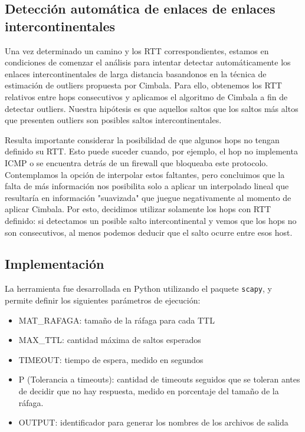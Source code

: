\subsection{Detección automática de enlaces de enlaces intercontinentales}

Una vez determinado un camino y los RTT correspondientes, estamos en condiciones de comenzar el análisis para intentar detectar automáticamente los enlaces intercontinentales de larga distancia basandonos en la técnica de estimación de outliers propuesta por Cimbala. Para ello, obtenemos los RTT relativos entre hops consecutivos y aplicamos el algoritmo de Cimbala a fin de detectar outliers. Nuestra hipótesis es que aquellos saltos que los saltos más altos que presenten outliers son posibles saltos intercontinentales. 

Resulta importante considerar la posibilidad de que algunos hops no tengan definido su RTT. Esto puede suceder cuando, por ejemplo, el hop no implementa ICMP o se encuentra detrás de un firewall que bloqueaba este protocolo. Contemplamos la opción de interpolar estos faltantes, pero concluimos que la falta de más información nos posibilita solo a aplicar un interpolado lineal que resultaría en información "suavizada" que juegue negativamente al momento de aplicar Cimbala. Por esto, decidimos utilizar solamente los hops con RTT definido: si detectamos un posible salto intercontinental y vemos que los hops no son consecutivos, al menos podemos deducir que el salto ocurre entre esos host. 


\subsection{Implementación}

La herramienta fue desarrollada en Python utilizando el paquete \texttt{scapy}, y permite definir los siguientes parámetros de ejecución:
\begin{itemize}
	\item{MAT\_RAFAGA: tamaño de la ráfaga para cada TTL}
	\item{MAX\_TTL: cantidad máxima de saltos esperados}
	\item{TIMEOUT: tiempo de espera, medido en segundos }
	\item{P (Tolerancia a timeouts): cantidad de timeouts seguidos que se toleran antes de decidir que no hay respuesta, medido en porcentaje del tamaño de la ráfaga.}
	\item{OUTPUT: identificador para generar los nombres de los archivos de salida}
\end{itemize}

